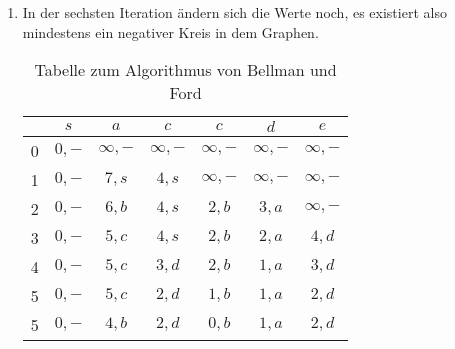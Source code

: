 \documentclass[a4paper]{scrartcl}
\begin{document}
\begin{enumerate}[label=\bfseries\arabic*.]
\begin{enumerate}
            \item
                In der sechsten Iteration ändern sich die Werte noch,
                es existiert also mindestens ein negativer Kreis in dem Graphen.
                \begin{table}[h]
                    \centering
                    \begin{tabular}{r|c|c|c|c|c|c|}
                          & $s$ & $a$ & $c$ & $c$ & $d$ & $e$ \\ \hline
                        0 & $0,-$ & $\infty,-$ & $\infty,-$ & $\infty,-$ & $\infty,-$ & $\infty,-$ \\
                        1 & $0,-$ & $7,s$ & $4,s$ & $\infty,-$ & $\infty,-$ & $\infty,-$ \\
                        2 & $0,-$ & $6,b$ & $4,s$ & $2,b$ & $3,a$ & $\infty,-$ \\
                        3 & $0,-$ & $5,c$ & $4,s$ & $2,b$ & $2,a$ & $4,d$ \\
                        4 & $0,-$ & $5,c$ & $3,d$ & $2,b$ & $1,a$ & $3,d$ \\
                        5 & $0,-$ & $5,c$ & $2,d$ & $1,b$ & $1,a$ & $2,d$ \\
                        5 & $0,-$ & $4,b$ & $2,d$ & $0,b$ & $1,a$ & $2,d$ \\
                    \end{tabular}
                    \caption{Tabelle zum Algorithmus von Bellman und Ford}
                    \label{tab:bf2}
                \end{table}

        \end{enumerate}

\end{enumerate}
\end{document}
